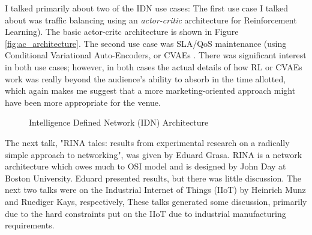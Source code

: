 \documentclass[11pt, oneside]{article}   	%
\begin{document}
\bigskip
\noindent
I talked primarily about two of the IDN use cases: The first use case I talked about was traffic balancing 
using an \emph{actor-critic} architecture for Reinforcement Learning\cite{Sutton:1998:IRL:551283,Lillicrap:2015aa}). 
The basic actor-critc architecture is shown in Figure \ref{fig:ac_architecture}. The second use case was
 SLA/QoS maintenance (using Conditional Variational Auto-Encoders, or CVAEs \cite{NIPS2015_5775}. There 
 was significant interest in both use cases; however, in both cases the actual details of how RL or CVAEs work was 
 really beyond the audience's ability to absorb in the time allotted, which again makes me suggest that a more 
 marketing-oriented approach might have been more appropriate for the venue. 

\begin{figure}
\caption{Intelligence Defined Network (IDN) Architecture}
\label{fig:idn_architecture}
\end{figure}

\bigskip
\noindent
The next talk, "RINA tales: results from experimental research on a radically simple approach to networking", was given by Eduard Grasa. RINA is a network architecture which owes much to OSI model and is designed by John Day at Boston University. Eduard presented results, but there was little discussion. The next two talks were on the Industrial Internet of Things (IIoT) by Heinrich Munz and Ruediger Kays, respectively, These talks generated some discussion, primarily due to the hard constraints put on the IIoT due to industrial manufacturing requirements. 
\end{document}
